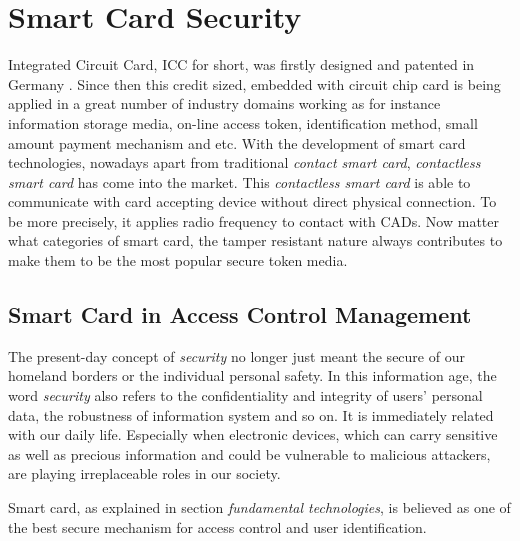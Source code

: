 \section{Smart Card Security}
Integrated Circuit Card, ICC for short, was firstly designed and patented in Germany \cite{smart_card_history}. Since then this credit sized, embedded with circuit chip card is being applied in a great number of industry domains working as for instance information storage media, on-line access token, identification method, small amount payment mechanism and etc. With the development of smart card technologies, nowadays apart from traditional \emph{contact smart card}, \emph{contactless smart card} \cite{smart_card_contactless} has come into the market. This \emph{contactless smart card} is able to communicate with card accepting device without direct physical connection. To be more precisely, it applies radio frequency to contact with CADs. Now matter what categories of smart card, the tamper resistant nature always contributes to make them to be the most popular secure token media.
\subsection{Smart Card in Access Control Management}\label{secSCAC}
The present-day concept of \emph{security} no longer just meant the secure of our homeland borders or the individual personal safety. In this information age, the word \emph{security} also refers to the confidentiality and integrity of users' personal data, the robustness of information system and so on. It is immediately related with our daily life. Especially when electronic devices, which can carry sensitive as well as precious information and could be vulnerable to malicious attackers, are playing irreplaceable roles in our society. 

Smart card, as explained in section \emph{fundamental technologies}, is believed as one of the best secure mechanism for access control and user identification. 

